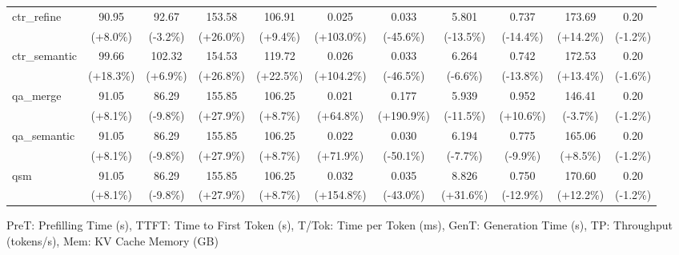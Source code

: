 \begin{table}[t]
{\begin{tabular}{l|cccccccccc}
    ctr\_refine & 90.95 & 92.67 & 153.58 & 106.91 & 0.025 & 0.033 & 5.801 & 0.737 & 173.69 & 0.20 \\
     & {\tiny\color{red!70!black}(+8.0\%)} & {\tiny\color{green!60!black}(-3.2\%)} & {\tiny\color{red!70!black}(+26.0\%)} & {\tiny\color{red!70!black}(+9.4\%)} & {\tiny\color{red!70!black}(+103.0\%)} & {\tiny\color{green!60!black}(-45.6\%)} & {\tiny\color{green!60!black}(-13.5\%)} & {\tiny\color{green!60!black}(-14.4\%)} & {\tiny\color{green!60!black}(+14.2\%)} & {\tiny\color{green!60!black}(-1.2\%)} \\
    ctr\_semantic & 99.66 & 102.32 & 154.53 & 119.72 & 0.026 & 0.033 & 6.264 & 0.742 & 172.53 & 0.20 \\
     & {\tiny\color{red!70!black}(+18.3\%)} & {\tiny\color{red!70!black}(+6.9\%)} & {\tiny\color{red!70!black}(+26.8\%)} & {\tiny\color{red!70!black}(+22.5\%)} & {\tiny\color{red!70!black}(+104.2\%)} & {\tiny\color{green!60!black}(-46.5\%)} & {\tiny\color{green!60!black}(-6.6\%)} & {\tiny\color{green!60!black}(-13.8\%)} & {\tiny\color{green!60!black}(+13.4\%)} & {\tiny\color{green!60!black}(-1.6\%)} \\
    qa\_merge & 91.05 & 86.29 & 155.85 & 106.25 & 0.021 & 0.177 & 5.939 & 0.952 & 146.41 & 0.20 \\
     & {\tiny\color{red!70!black}(+8.1\%)} & {\tiny\color{green!60!black}(-9.8\%)} & {\tiny\color{red!70!black}(+27.9\%)} & {\tiny\color{red!70!black}(+8.7\%)} & {\tiny\color{red!70!black}(+64.8\%)} & {\tiny\color{red!70!black}(+190.9\%)} & {\tiny\color{green!60!black}(-11.5\%)} & {\tiny\color{red!70!black}(+10.6\%)} & {\tiny\color{red!70!black}(-3.7\%)} & {\tiny\color{green!60!black}(-1.2\%)} \\
    qa\_semantic & 91.05 & 86.29 & 155.85 & 106.25 & 0.022 & 0.030 & 6.194 & 0.775 & 165.06 & 0.20 \\
     & {\tiny\color{red!70!black}(+8.1\%)} & {\tiny\color{green!60!black}(-9.8\%)} & {\tiny\color{red!70!black}(+27.9\%)} & {\tiny\color{red!70!black}(+8.7\%)} & {\tiny\color{red!70!black}(+71.9\%)} & {\tiny\color{green!60!black}(-50.1\%)} & {\tiny\color{green!60!black}(-7.7\%)} & {\tiny\color{green!60!black}(-9.9\%)} & {\tiny\color{green!60!black}(+8.5\%)} & {\tiny\color{green!60!black}(-1.2\%)} \\
    qsm & 91.05 & 86.29 & 155.85 & 106.25 & 0.032 & 0.035 & 8.826 & 0.750 & 170.60 & 0.20 \\
     & {\tiny\color{red!70!black}(+8.1\%)} & {\tiny\color{green!60!black}(-9.8\%)} & {\tiny\color{red!70!black}(+27.9\%)} & {\tiny\color{red!70!black}(+8.7\%)} & {\tiny\color{red!70!black}(+154.8\%)} & {\tiny\color{green!60!black}(-43.0\%)} & {\tiny\color{red!70!black}(+31.6\%)} & {\tiny\color{green!60!black}(-12.9\%)} & {\tiny\color{green!60!black}(+12.2\%)} & {\tiny\color{green!60!black}(-1.2\%)} \\
    \bottomrule
    \end{tabular}%
    }
    \vspace{0.1cm}
    \footnotesize{PreT: Prefilling Time (s), TTFT: Time to First Token (s), T/Tok: Time per Token (ms), GenT: Generation Time (s), TP: Throughput (tokens/s), Mem: KV Cache Memory (GB)}
\end{table}

